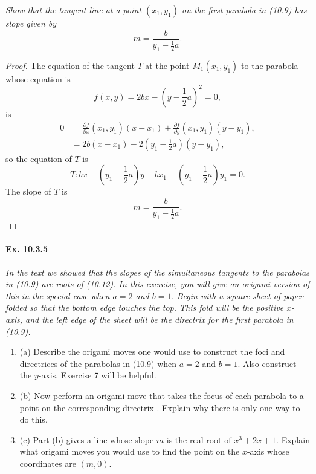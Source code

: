 \documentclass[11pt,a4paper]{article}
\newcommand{\be} {\begin{enumerate}}
\newcommand{\ee} {\end{enumerate}}
\begin{document}
{\it Show that the tangent line at a point $(x_1,y_1)$ on the first parabola in (10.9) has slope given by
$$m=\frac{b}{y_1-\frac{1}{2}a}.$$
}

\begin{proof}The equation of the tangent $T$ at the point $M_1(x_1,y_1)$ to the parabola whose equation is
$$f(x,y) = 2bx - \left(y-\frac{1}{2}a\right)^2 =0,$$
is
\begin{align*}
0 &=\frac{\partial f}{\partial x}(x_1,y_1) (x-x_1) + \frac{\partial f}{\partial y}(x_1,y_1) (y-y_1),\\
&= 2b (x-x_1) -  2\left(y_1-\frac{1}{2}a\right) (y-y_1),
\end{align*}
so the equation of $T$ is
$$T : bx - \left(y_1-\frac{1}{2}a\right)y -bx_1+\left(y_1-\frac{1}{2}a\right)y_1 = 0.$$
The slope of $T$ is 
$$m=\frac{b}{y_1-\frac{1}{2}a}.$$
\end{proof}

\paragraph{Ex. 10.3.5}

{\it In the text we showed that the slopes of the simultaneous tangents to the parabolas in (10.9) are roots of (10.12). In this exercise, you will give an origami version of this in the special case when $a=2$ and $b=1$. Begin with a square sheet of paper folded so that the bottom edge touches the top. This fold will be the positive $x$-axis, and the left edge of the sheet will be the directrix for the first parabola in (10.9).
\be
\item[(a)] Describe the origami moves one would use to construct the foci and directrices of the parabolas in (10.9) when $a=2$ and $b=1$. Also construct the $y$-axis. Exercise 7 will be helpful.
\item[(b)] Now perform an origami move that takes the focus of each parabola to a point on the corresponding directrix . Explain why there is only one way to do this.
\item[(c)] Part (b) gives a line whose slope $m$ is the real root of $x^3+2x+1$. Explain what origami moves you would use to find the point on the $x$-axis whose coordinates are $(m,0)$.
\ee
}
\end{document}
